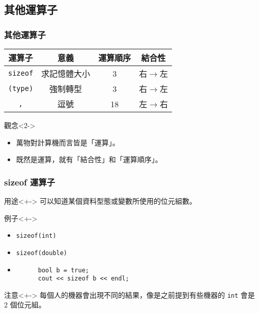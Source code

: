\documentclass[utf8]{beamer}
\begin{document}
\begin{CJK}{UTF8}{bkai}
\section{其他運算子}

\begin{frame}[fragile]
  \frametitle{其他運算子}
  \begin{table}[h]
    \begin{tabular}{|c|c|c|c|}
    \hline
    運算子                & 意義       & 運算順序 & 結合性\\
    \hline
    \lstinline{sizeof}{} & 求記憶體大小 & 3      & \alert{右$\rightarrow$左}\\
    \hline
    \lstinline{(type)}{} & 強制轉型    & 3      & \alert{右$\rightarrow$左}\\
    \hline
    \lstinline{,}{}      & 逗號       & 18      & 左$\rightarrow$右\\
    \hline
    \end{tabular}
  \end{table}
  \begin{alertblock}{觀念}<2->
    \begin{itemize}
    \item 萬物對計算機而言皆是「\alert{運算}」。
    \item<3-> 既然是運算，就有「結合性」和「運算順序」。
    \end{itemize}
  \end{alertblock}
\end{frame}

\begin{frame}[fragile]
  \frametitle{sizeof 運算子}
  \begin{block}{用途}<+->
  可以知道某個\alert{資料型態}或\alert{變數}所使用的位元組數。
  \end{block}
  \begin{exampleblock}{例子}<+->
    \begin{itemize}
    \item \lstinline{sizeof(int)}{}
    \item<+-> \lstinline{sizeof(double)}{}
    \item<+->
      \begin{lstlisting}
      bool b = true;
      cout << sizeof b << endl;
      \end{lstlisting}
    \end{itemize}
  \end{exampleblock}
  \begin{alertblock}{注意}<+->
  每個人的機器會出現不同的結果，像是之前提到有些機器的 \lstinline{int}{} 會是 2 個位元組。
  \end{alertblock}
\end{frame}


\end{CJK}
\end{document}
